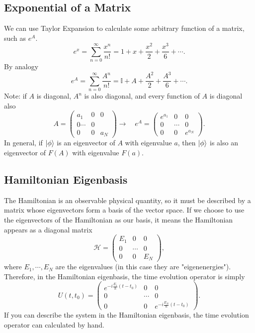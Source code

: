 \documentclass{article}
\begin{document}
\subsection{Exponential of a Matrix}
We can use Taylor Expansion to calculate some arbitrary function of a matrix, such as $e^A$.
\[
    e^x=\sum_{n=0}^{\infty} \frac{x^n}{n!}=1+x+\frac{x^2}{2}+\frac{x^3}{6}+\cdots.
\]
By analogy
\[
    e^A=\sum_{n=0}^{\infty} \frac{A^n}{n!}=\mathbb{I}+A+\frac{A^2}{2}+\frac{A^3}{6}+\cdots.
\]
Note: if $A$ is diagonal, $A^n$ is also diagonal, and every function of $A$ is diagonal also
\[
    A=\begin{pmatrix}
        a_1 & 0 & 0 \\ 0 \cdots & 0 \\ 0 & 0 & a_N
    \end{pmatrix}\to\quad e^A=\begin{pmatrix}
        e^{a_1} & 0 & 0 \\ 0 & \cdots & 0 \\ 0 & 0 & e^{a_N}
    \end{pmatrix}.
\]
In general, if $\ket{\phi }$ is an eigenvector of $A$ with eigenvalue $a$, then $\ket{\phi }$ is also an eigenvector of $F(A)$ with eigenvalue $F(a)$.

\subsection{Hamiltonian Eigenbasis}
The Hamiltonian is an observable physical quantity, so it must be described by a matrix whose eigenvectors form a basis of the vector space. If we choose to use the eigenvectors of the Hamiltonian as our basis, it means the Hamiltonian appears as a diagonal matrix
\[
    \mathcal{H}=\begin{pmatrix}
        E_1 & 0 & 0 \\ 0 & \cdots & 0 \\ 0 & 0 & E_N
    \end{pmatrix},
\]
where $E_1,\cdots,E_N$ are the eigenvalues (in this case they are "eigenenergies"). Therefore, in the Hamiltonian eigenbasis, the time evolution operator is simply
\[
    U(t,t_0)=\begin{pmatrix}
        e^{-i \frac{E_1}{\hbar}(t-t_0)} & 0 & 0 \\
        0 & \cdots & 0 \\
        0 & 0 & e^{-i \frac{E_N}{\hbar}(t-t_0)}
    \end{pmatrix}.
\]
If you can describe the system in the Hamiltonian eigenbasis, the time evolution operator can calculated by hand.
\end{document}
